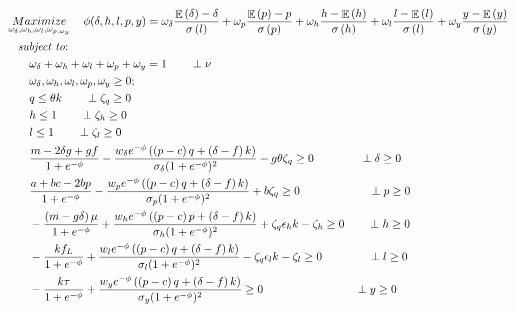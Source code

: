\begin{subequations}\label{eqBuyersMPEC}
	\begin{align}
	&\mathop {Maximize}\limits_{\omega_{\delta},\omega_{h},\omega_{l},\omega_{p,\omega_{y}}}
	\quad \phi(\delta, h, l, p, y) =  	 \omega_{\delta}\frac{\mathop{\mathbb{E}}\left(\delta\right)-\delta }
	{\sigma\left(l\right)}+\omega_{p}\frac{\mathop{\mathbb{E}}\left(p\right)-p}  {\sigma\left(p\right)} 
	+\omega_{h}\frac{ h-\mathop{\mathbb{E}}\left(h\right)}
	{\sigma\left(h\right)}+\omega_{l}\frac{ l-\mathop{\mathbb{E}}\left(l\right) }{\sigma\left(l\right)}+\omega_{y}\frac{y-\mathop{\mathbb{E}}\left(y\right)}{\sigma\left(y\right)} \label{eqBuyerObjective}\\
	&\quad \mbox{{\it subject to}:}\notag\\
 	&\qquad	 \omega_{\delta}+\omega_{h}+\omega_{l}+\omega_{p}+\omega_{y}=1\label{eqBuyerNormal} \qquad \perp \nu\\
	&\qquad  \omega_{\delta},\omega_{h},\omega_{l},\omega_{p},\omega_{y} \geq 0;\\
    &\qquad q \leq \theta k	\label{eqBuyerEnergySupply2} 	\qquad \perp \zeta_q\geq 0\\
    &\qquad   h \leq 1 \label{eqGeneratorFinance2}		\qquad \perp \zeta_h\geq 0\\
	&\qquad   l \leq 1 \label{eqGeneratorLocal2}			\qquad \perp \zeta_l\geq 0\\
    & \qquad  \frac{m-2\delta g + g f}{1+e^{-\phi}}-\frac{w_{\delta} e^{-\phi} \left(\left(p-c\right)q +\left(\delta-f\right)k\right)}{\sigma_{\delta}(1+e^{-\phi})^{2}}-g \theta \zeta_q  \geq 0 \qquad\qquad \perp \delta \geq 0\\
    &\qquad \frac{a+bc-2bp}{1+e^{-\phi}}-\frac{w_p e^{-\phi} \left(\left(p-c\right)q+\left(\delta-f\right)k\right)}{\sigma_{p}(1+e^{-\phi})^{2}}+b \zeta_q  \geq 0 \qquad\qquad\qquad \perp p \geq 0\\
    & \qquad -\frac{\left(m-g\delta\right)\mu}{1+e^{-\phi}}+{\frac{w_h e^{-\phi} \left(\left(p-c\right)p +\left(\delta-f\right)k\right)}{\sigma_{h}(1+e^{-\phi})^{2}}}+\zeta_q \epsilon_h k-\zeta_h \geq 0 \qquad \perp h\geq 0\\
    & \qquad -\frac{k f_{L}}{1+e^{-\phi}}+{\frac{w_l e^{-\phi} \left(\left(p-c\right)q  +\left(\delta-f\right)k\right)}{\sigma_{l}(1+e^{-\phi})^{2}}}-\zeta_q \epsilon_l k -\zeta_l \geq 0 \qquad\qquad \perp l\geq 0\\
    &\qquad  -\frac{k\tau}{1+e^{-\phi}}+ {\frac{w_y e^{-\phi} \left(\left(p-c\right)q +\left(\delta-f\right)k\right)}{\sigma_{y}(1+e^{-\phi})^{2}}} \geq 0 \qquad\qquad\qquad\qquad \perp y\geq 0\\  

\end{align}
\end{subequations}
